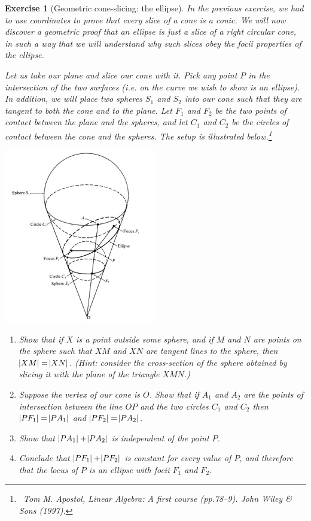 \documentclass[a4paper,leqno,10pt]{article}
\theoremstyle{exercise}
\newtheorem{Exercise}{Exercise}
\newenvironment{exercise}
  {\begin{mdframed}\begin{Exercise}}
  {\end{Exercise}\end{mdframed}}
\theoremstyle{plain}
\theoremstyle{definition}
\theoremstyle{remark}
\begin{document}
\begin{exercise}[Geometric cone-slicing: the ellipse]
  In the previous exercise, we had to use coordinates to prove that every slice of a cone is a conic. We will now
  discover a geometric proof that an ellipse is just a slice of a right circular cone, in such a way that we will
  understand why such slices obey the focii properties of the ellipse.

  Let us take our plane and slice our cone with it. Pick any point $ P $ in the intersection of the two surfaces (i.e.
  on the curve we wish to show is an ellipse). In addition, we will place two spheres $ S_1 $ and $ S_2 $ into our cone
  such that they are tangent to both the cone and to the plane. Let $ F_1 $ and $ F_2 $ be the two points of contact between
  the plane and the spheres, and let $ C_1 $ and $ C_2 $ be the circles of contact between the cone and the spheres. The
  setup is illustrated below.\footnote{~Tom M. Apostol, \emph{Linear Algebra: A first course} (pp.78--9). John Wiley \& Sons (1997).}

  \begin{center}
    \includegraphics[width=0.5\textwidth]{apostol}
  \end{center}

  \begin{enumerate}
    \item Show that if $ X $ is a point outside some sphere, and if $ M $ and $ N $ are points on the sphere such that $ XM $
          and $ XN $ are tangent lines to the sphere, then $ \abs{XM} = \abs{XN} $. (Hint: consider the cross-section of the sphere
          obtained by slicing it with the plane of the triangle $ XMN $.)
    \item Suppose the vertex of our cone is $ O $. Show that if $ A_1 $ and $ A_2 $ are the points of intersection
          between the line $ OP $ and the two circles $ C_1 $ and $ C_2 $ then $ \abs{PF_1} = \abs{PA_1} $ and $ \abs{PF_2} = \abs{PA_2} $.
    \item Show that $ \abs{PA_1} + \abs{PA_2} $ is independent of the point $ P $.
    \item Conclude that $ \abs{PF_1} + \abs{PF_2} $ is constant for every value of $ P $, and therefore that the locus of $ P $
          is an ellipse with focii $ F_1 $ and $ F_2 $.
  \end{enumerate}
\end{exercise}
\end{document}
